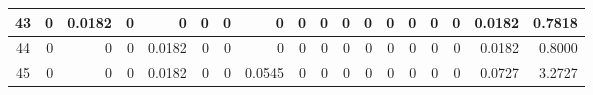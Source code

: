\begin{table}[ht]
\begin{adjustbox}{width = \textwidth, center}
\begin{tabular}{|c|r|r|r|r|r|r|r|r|r|r|r|r|r|r|r|r|r|}
            \rowcolor[HTML]{FFFFFF} 
            \cellcolor[HTML]{CFE2F3}43                           & 0                                              & \cellcolor[HTML]{C7E9D8}0.0182                 & 0                                              & 0                                              & 0                                              & 0                                              & 0                                              & 0                                               & 0                                               & 0                                               & 0                                               & 0                                               & 0                                               & 0                                               & 0                                               & \cellcolor[HTML]{D9D2E9}0.0182                                                        & \cellcolor[HTML]{D9D2E9}0.7818                                                            \\ \hline
            \rowcolor[HTML]{FFFFFF} 
            \cellcolor[HTML]{CFE2F3}44                           & 0                                              & 0                                              & 0                                              & \cellcolor[HTML]{C7E9D8}0.0182                 & 0                                              & 0                                              & 0                                              & 0                                               & 0                                               & 0                                               & 0                                               & 0                                               & 0                                               & 0                                               & 0                                               & \cellcolor[HTML]{D9D2E9}0.0182                                                        & \cellcolor[HTML]{D9D2E9}0.8000                                                            \\ \hline
            \rowcolor[HTML]{FFFFFF} 
            \cellcolor[HTML]{CFE2F3}45                           & 0                                              & 0                                              & 0                                              & \cellcolor[HTML]{C7E9D8}0.0182                 & 0                                              & 0                                              & \cellcolor[HTML]{57BB8A}0.0545                 & 0                                               & 0                                               & 0                                               & 0                                               & 0                                               & 0                                               & 0                                               & 0                                               & \cellcolor[HTML]{D9D2E9}0.0727                                                        & \cellcolor[HTML]{D9D2E9}3.2727                                                            \\ \hline

\end{tabular}
\end{adjustbox}
\end{table}
